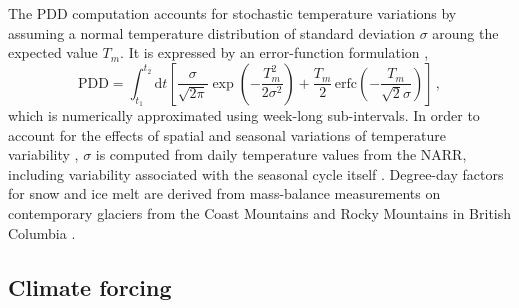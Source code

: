 \documentclass[tc]{copernicus}
\begin{document}
The PDD computation accounts for stochastic temperature variations by assuming
a normal temperature distribution of standard deviation $\sigma$ aroung the
expected value $T_m$. It is expressed by an error-function formulation
\citep{Calov.Greve.2005},
\begin{equation}
    \label{eqn:calovgreve}
    \mathrm{PDD} = \int_{t_1}^{t_2} \mathrm{d}t
        \left[\frac{\sigma}{\sqrt{2\pi}}
                \exp\left({-\frac{T_{m}^2}{2\sigma^2}}\right)
              + \frac{T_{m}}{2} \, \mathrm{erfc}
                \left(-\frac{T_{m}}{\sqrt{2}\sigma}\right)\right] \,,
\end{equation}
which is numerically approximated using week-long sub-intervals. In order to
account for the effects of spatial and seasonal variations of temperature
variability \citep{Seguinot.2013}, $\sigma$ is computed from daily temperature
values from the NARR, including variability associated with the seasonal cycle
itself \citep[Fig.~\ref{fig:atm}; i.e. not as in][]{Seguinot.Rogozhina.2014}.
Degree-day factors for snow and ice melt are derived from
mass-balance measurements on contemporary glaciers from the Coast Mountains and
Rocky Mountains in British Columbia
\citep[Table~\ref{tab:params};][]{Shea.etal.2009}.

\subsection{Climate forcing}
\label{sec:atm}
\end{document}
